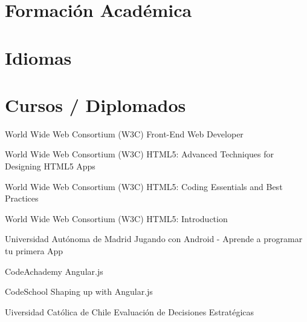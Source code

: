 \documentclass[]{cvStyle1}
\begin{document}
    \section*{Formaci\'on Acad\'emica}
    
    \section*{Idiomas}
    
    \pagebreak
    
    
        
        
        
        
        
        
        
        
    \section*{Cursos / Diplomados}
        \skill
            {World Wide Web Consortium (W3C)}
            {Front-End Web Developer}

        \skill
            {World Wide Web Consortium (W3C)}
            {HTML5: Advanced Techniques for Designing HTML5 Apps}

        \skill
            {World Wide Web Consortium (W3C)}
            {HTML5: Coding Essentials and Best Practices}

        \skill
            {World Wide Web Consortium (W3C)}
            {HTML5: Introduction}

        \skill
            {Universidad Aut\'onoma de Madrid}
            {Jugando con Android - Aprende a programar tu primera App}

        \skill
            {CodeAchademy}
            {Angular.js}

        \skill
            {CodeSchool}
            {Shaping up with Angular.js}

        \skill
            {Uiversidad Cat\'olica de Chile}
            {Evaluaci\'on de Decisiones Estrat\'egicas}
\end{document}
